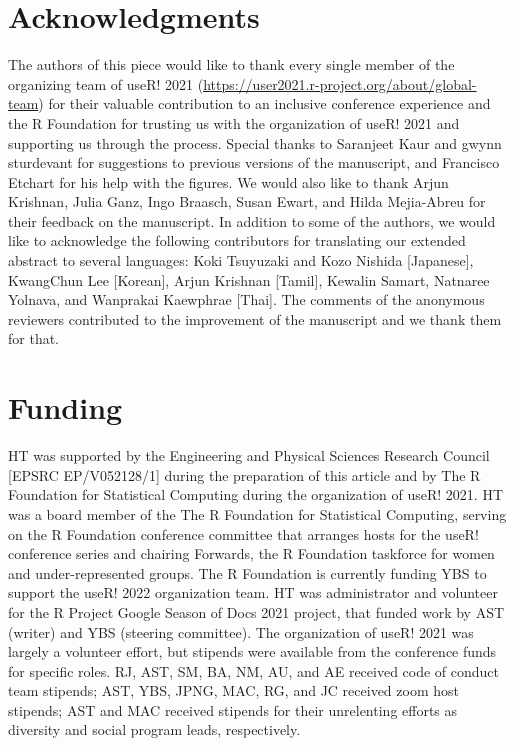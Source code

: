 \documentclass[10pt,letterpaper]{article}
\begin{document}
\section*{Acknowledgments}
The authors of this piece would like to thank every single member of the organizing team of useR! 2021 (\url{https://user2021.r-project.org/about/global-team}) for their valuable contribution to an inclusive conference experience and the R Foundation for trusting us with the organization of useR! 2021 and supporting us through the process. Special thanks to Saranjeet Kaur and gwynn sturdevant for suggestions to previous versions of the manuscript, and Francisco Etchart for his help with the figures. We would also like to thank Arjun Krishnan, Julia Ganz, Ingo Braasch, Susan Ewart, and Hilda Mejia-Abreu for their feedback on the manuscript. In addition to some of the authors, we would like to acknowledge the following contributors for translating our extended abstract to several languages: Koki Tsuyuzaki and Kozo Nishida [Japanese], KwangChun Lee [Korean], Arjun Krishnan [Tamil], Kewalin Samart, Natnaree Yolnava, and Wanprakai Kaewphrae [Thai].
The comments of the anonymous reviewers contributed to the improvement of the manuscript and we thank them for that.

\section*{Funding}

HT was supported by the Engineering and Physical Sciences Research Council [EPSRC EP/V052128/1] during the preparation of this article and by The R Foundation for Statistical Computing during the organization of useR! 2021. HT was a board member of the The R Foundation for Statistical Computing, serving on the R Foundation conference committee that arranges hosts for the useR! conference series and chairing Forwards, the R Foundation taskforce for women and under-represented groups. The R Foundation is currently funding YBS to support the useR! 2022 organization team. HT was administrator and volunteer for the R Project Google Season of Docs 2021 project, that funded work by AST (writer) and YBS (steering committee).
The organization of useR! 2021 was largely a volunteer effort, but stipends were available from the conference funds for specific roles. RJ, AST, SM, BA, NM, AU, and AE received code of conduct team stipends; AST, YBS, JPNG, MAC, RG, and JC received zoom host stipends; AST and MAC received stipends for their unrelenting efforts as diversity and social program leads, respectively.
\end{document}
